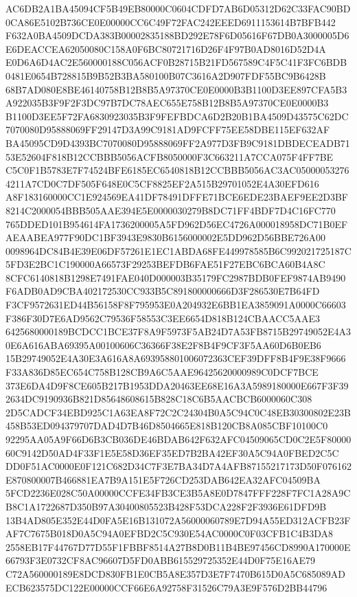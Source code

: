 \documentclass[UTF8,fontset=fandol,zihao=-4,a4paper]{ctexart}
\begin{document}
{{AC6DB2A1BA45094CF5B49EB80000C0604CDFD7AB6D05312D62C33FAC90BD0CA86E5102B736CE0E00000CC6C49F72FAC242EEED6911153614B7BFB442
F632A0BA4509DCDA383B00002835188BD292E78F6D05616F67DB0A3000005D6E6DEACCEA62050080C158A0F6BC80721716D26F4F97B0AD8016D52D4A
E0D6A6D4AC2E560000188C056ACF0B28715B21FD567589C4F5C41F3FC6BDB0481E0654B728815B9B52B3BA580100B07C3616A2D907FDF55BC9B6428B
68B7AD080E8BE46140758B12B8B5A97370CE0E0000B3B1100D3EE897CFA5B3A922035B3F9F2F3DC97B7DC78AEC655E758B12B8B5A97370CE0E0000B3
B1100D3EE5F72FA6830923035B3F9FEFBDCA6D2B20B1BA4509D43575C62DC7070080D95888069FF29147D3A99C9181AD9FCFF75EE58DBE115EF632AF
BA45095CD9D4393BC7070080D95888069FF2A977D3FB9C9181DBDECEADB7153E52604F818B12CCBBB5056ACFB8050000F3C663211A7CCA075F4FF7BE
C5C0F1B5783E7F74524BFE6185EC6540818B12CCBBB5056AC3AC050000532764211A7CD0C7DF505F648E0C5CF8825EF2A515B29701052E4A30EFD616
A8F183160000CC1E924569EA41DF78491DFFE71BCE6EDE23BAEF9EE2D3BF8214C2000054BBB505AAE394E5E0000030279B8DC71FF4BDF7D4C16FC770
765DDED101B954614FA1736200005A5FD962D56EC4726A000018958DC71B0EFAEAABEA977F90DC1BF3943E9830B6156000002E5DD962D56BBE726A00
0098964DC84B4E39E06DF57261E1EC1ABDA68FE449978585B6C992021725187C5FD3E2BC1C190000A66573F29253BEFDB6FAE51F27EBC6BCA60B4A8C
8CFC6140818B1298E7491FAE040D000003B35179FC2987BDB0FEF9874AB9490F6ADB0AD9CBA402172530CC933B5C891800000666D3F286530E7B64FD
F3CF9572631ED44B56158F8F795953E0A204932E6BB1EA3859091A0000C66603F386F30D7E6AD9562C79536F58553C3EE6654D818B124CBAACC5AAE3
6425680000189BCDCC1BCE37F8A9F5973F5AB24D7A53FB8715B29749052E4A30E6A616ABA69395A00100606C36366F38E2F8B4F9CF3F5AA60D6B0EB6
15B29749052E4A30E3A616A8A693958801006072363CEF39DFF8B4F9E38F9666F33A836D85EC654C758B128CB9A6C5AAE96425620000989C0DCF7BCE
373E6DA4D9F8CE605B217B1953DDA20463EE68E16A3A5989180000E667F3F392634DC9190936B821D85648608615B828C18C6B5AACBCB6000060C308
2D5CADCF34EBD925C1A63EA8F72C2C24304B0A5C94C0C48EB30300802E23B458B53ED094379707DAD4D7B46D8504665E818B120CB8A085CBF10100C0
92295AA05A9F66D6B3CB036DE46BDAB642F632AFC04509065CD0C2E5F8000060C9142D50AD4F33F1E5E58D36EF35ED7B2BA42EF30A5C94A0FBED2C5C
DD0F51AC0000E0F121C682D34C7F3E7BA34D7A4AFB87155217173D50F076162E870800007B466881EA7B9A151E5F726CD253DAB642EA32AFC04509BA
5FCD2236E028C50A00000CCFE34FB3CE3B5A8E0D7847FFF228F7FC1A28A9CB8C1A1722687D350B97A30400805523B428F53DCA228F2F3936E61DFD9B
13B4AD805E352E44D0FA5E16B131072A56000060789E7D94A55ED312ACFB23FAF7C7675B018D0A5C94A0EFBD2C5C930E54AC0000C0F03CFB1C4B3DA8
2558EB17F44767D77D55F1FBBF8514A27B8D0B11B4BE97456CD8990A170000E66793F3E0732CF8AC96607D5FD0ABB615529725352E44D0F75E16AE79
C72A560000189E8DCD830FB1E0CB5A8E357D3E7F7470B615D0A5C685089ADECB623575DC122E00000CCF66E6A92758F31526C79A3E9F576D2BB44796
}}
\end{document}
